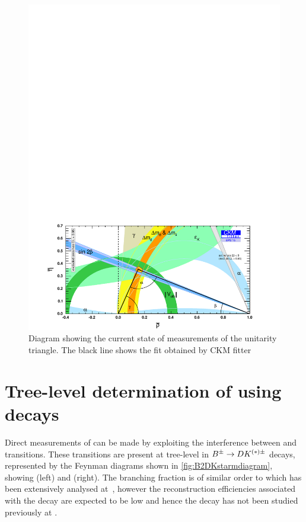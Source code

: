 \begin{figure}[!ht]
\centering
\includegraphics[trim = 0mm 0mm 0mm 180mm,clip,width=0.9\linewidth]{figures/theory/rhoeta_small_global.pdf}
\caption{Diagram showing the current state of measurements of the unitarity triangle. The black line shows the fit obtained by CKM fitter}
\label{globalfit}
\end{figure}

\section{Tree-level determination of \Pgamma using  decays}
\label{sec:theory:gamma}

Direct measurements of \Pgamma can be made by exploiting the interference between \decay{\bquark}{\cquark\uquarkbar\squark} and \decay{\bquark}{\uquark\cquarkbar\squark} transitions. These transitions are present at tree-level in ${{B}^\pm} \rightarrow {\ensuremath{D}}{\ensuremath{K}}^{(*)\pm}$ decays, represented by the Feynman diagrams shown in \fig\ref{fig:B2DKstarmdiagram}, showing \decay{\Bm}{\Dz\Kstarm} (left) and \decay{\Bm}{\Dzb\Kstarm} (right). The branching
fraction is of similar order to \decay{\Bm}{\Dzb\Km} which has been extensively analysed at~\cite{LHCb-PAPER-2016-003,LHCb-PAPER-2014-041,LHCb-PAPER-2015-014}, however the reconstruction efficiencies associated with the \Kstarm decay are expected to be low and hence the decay has not been studied previously at \lhcb. 


